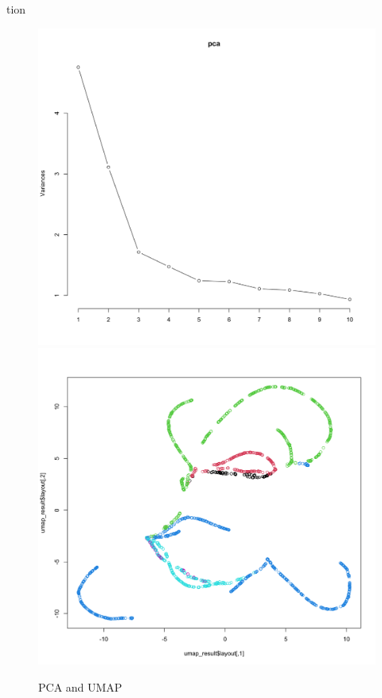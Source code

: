 tion\documentclass[8pt]{article}
\begin{document}
\begin{figure}[H]
    \centering
    \includegraphics*[scale=0.1]{figures/PCA.png}
    \includegraphics*[scale=0.1]{figures/UMAP_PAC2.png}
    \caption{PCA and UMAP}
    \label{fig:PCA_and_UMAP}
\end{figure}
\end{document}
